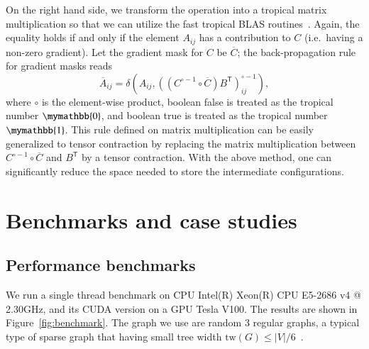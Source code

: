 \documentclass[onefignum, onetabnum]{siamart190516}
\newcommand{\<}{\langle}
\renewcommand{\>}{\rangle}
\begin{document}
On the right hand side, we transform the operation into a tropical matrix multiplication so that we can utilize the fast tropical BLAS routines~\cite{TropicalGEMM}.
Again, the equality holds if and only if the element $A_{ij}$ has a contribution to $C$ (i.e.\ having a non-zero gradient).
Let the gradient mask for $C$ be $\overline C$; the back-propagation rule for gradient masks reads
\begin{equation}
\overline{A}_{ij} = \delta \left(A_{ij}, \left( \left( C^{\circ-1} \circ \overline C \right) B^{\mathsf{T}} \right)_{ij}^{\circ -1} \right),
\end{equation}
where $\circ$ is the element-wise product, boolean false is treated as the tropical number $\mymathbb{0}$, and boolean true is treated as the tropical number $\mymathbb{1}$.
This rule defined on matrix multiplication can be easily generalized to tensor contraction by replacing the matrix multiplication between $C^{\circ-1} \circ \overline C$ and $B^{\mathsf{T}}$ by a tensor contraction.
With the above method, one can significantly reduce the space needed to store the intermediate configurations.

\section{Benchmarks and case studies}
\subsection{Performance benchmarks}
We run a single thread benchmark on CPU Intel(R) Xeon(R) CPU E5-2686 v4 @ 2.30GHz,
and its CUDA version on a GPU Tesla V100.
The results are shown in Figure~\ref{fig:benchmark}.
The graph we use are random 3 regular graphs, a typical type of sparse graph that having small tree width $\text{tw}(G) \leq |V|/6$~\cite{Fomin2006}.
\end{document}
